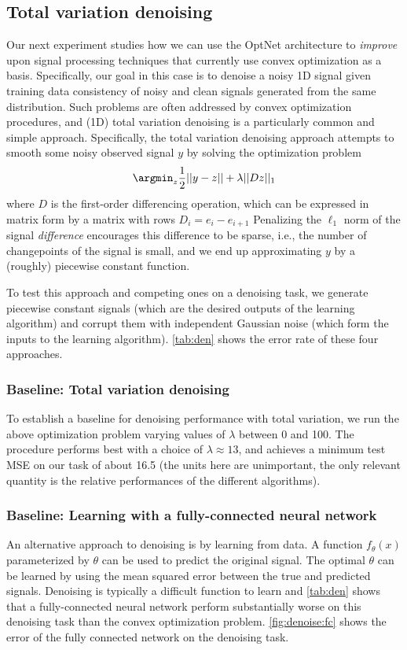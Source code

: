 \subsection{Total variation denoising}
Our next experiment studies how we can use the OptNet architecture to
\emph{improve} upon signal processing techniques that currently use convex
optimization as a basis.  Specifically, our goal in this case is to denoise a noisy
1D signal given training data consistency of noisy and clean signals generated
from the same distribution.  Such problems are often addressed by convex
optimization procedures, and (1D) total variation denoising is a particularly
common and simple approach.  Specifically, the total variation denoising
approach attempts to smooth some noisy observed signal $y$ by solving the
optimization problem
\begin{equation}
  \argmin_z \frac{1}{2} ||y-z|| + \lambda ||Dz||_1
  \label{eq:tv}
\end{equation}
where $D$ is the first-order differencing operation, which
can be expressed in matrix form by a matrix with rows $D_i=e_i-e_{i+1}$
Penalizing the $\ell_1$
norm of the signal \emph{difference} encourages this
difference to be sparse,
i.e., the number of changepoints of the signal is small, and we end
up approximating $y$ by a (roughly) piecewise constant function.

To test this approach and competing ones on a denoising task,
we generate piecewise constant signals
(which are the desired outputs of the learning algorithm)
and corrupt them with independent Gaussian noise
(which form the inputs to the learning algorithm).
\cref{tab:den} shows the error rate of these
four approaches.

\subsubsection{Baseline: Total variation denoising}
To establish a baseline for denoising performance with total variation,
we run the above optimization problem varying values of
$\lambda$ between 0 and 100.
The procedure performs best with a choice of $\lambda \approx 13$,
and achieves a minimum test MSE on our task of about
16.5 (the units here are unimportant, the only relevant quantity is the
relative performances of the different algorithms).

\subsubsection{Baseline: Learning with a fully-connected neural network}
An alternative approach to denoising is by learning from data.
A function $f_\theta(x)$ parameterized by $\theta$ can
be used to predict the original signal.
The optimal $\theta$ can be learned by using
the mean squared error between the true and predicted signals.
Denoising is typically a difficult function to learn and
\cref{tab:den} shows that a fully-connected neural network perform
substantially worse on this denoising task than the
convex optimization problem.
\cref{fig:denoise:fc} shows the error of the fully connected
network on the denoising task.


